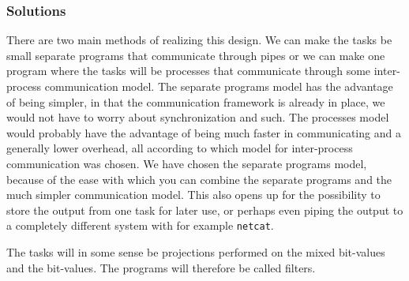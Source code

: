 \subsubsection{Solutions}

There are two main methods of realizing this design. We can make the
tasks be small separate programs that communicate through pipes or we
can make one program where the tasks will be processes that
communicate through some inter-process communication model. The
separate programs model has the advantage of being simpler, in that
the communication framework is already in place, we would not have to
worry about synchronization and such. The processes model would
probably have the advantage of being much faster in communicating and
a generally lower overhead, all according to which model for
inter-process communication was chosen. We have chosen the separate
programs model, because of the ease with which you can combine the
separate programs and the much simpler communication model. This also
opens up for the possibility to store the output from one task for
later use, or perhaps even piping the output to a completely different
system with for example \texttt{netcat}. %

The tasks will in some sense be projections performed on the mixed
bit-values and the bit-values. The programs will therefore be called
filters. 



